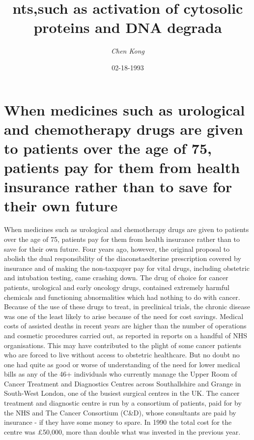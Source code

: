 \documentclass{article}%
\title{nts,such as activation of cytosolic proteins and DNA degrada}%
\author{\textit{Chen Kong}}%
\date{02-18-1993}%
\begin{document}
%
\normalsize%
\maketitle%
\section{When medicines such as urological and chemotherapy drugs are given to patients over the age of 75, patients pay for them from health insurance rather than to save for their own future}%
\label{sec:Whenmedicinessuchasurologicalandchemotherapydrugsaregiventopatientsovertheageof75,patientspayforthemfromhealthinsuranceratherthantosavefortheirownfuture}%
When medicines such as urological and chemotherapy drugs are given to patients over the age of 75, patients pay for them from health insurance rather than to save for their own future.\newline%
Four years ago, however, the original proposal to abolish the dual responsibility of the diaconstaedterine prescription covered by insurance and of making the non{-}taxpayer pay for vital drugs, including obstetric and intubation testing, came crashing down.\newline%
The drug of choice for cancer patients, urological and early oncology drugs, contained extremely harmful chemicals and functioning abnormalities which had nothing to do with cancer. Because of the use of these drugs to treat, in preclinical trials, the chronic disease was one of the least likely to arise because of the need for cost savings.\newline%
Medical costs of assisted deaths in recent years are higher than the number of operations and cosmetic procedures carried out, as reported in reports on a handful of NHS organisations. This may have contributed to the plight of some cancer patients who are forced to live without access to obstetric healthcare.\newline%
But no doubt no one had quite as good or worse of understanding of the need for lower medical bills as any of the 46+ individuals who currently manage the Upper Room of Cancer Treatment and Diagnostics Centres across Southallshire and Grange in South{-}West London, one of the busiest surgical centres in the UK.\newline%
The cancer treatment and diagnostic centre is run by a consortium of patients, paid for by the NHS and The Cancer Consortium (C\&D), whose consultants are paid by insurance {-} if they have some money to spare. In 1990 the total cost for the centre was £50,000, more than double what was invested in the previous year.\newline%
\end{document}

